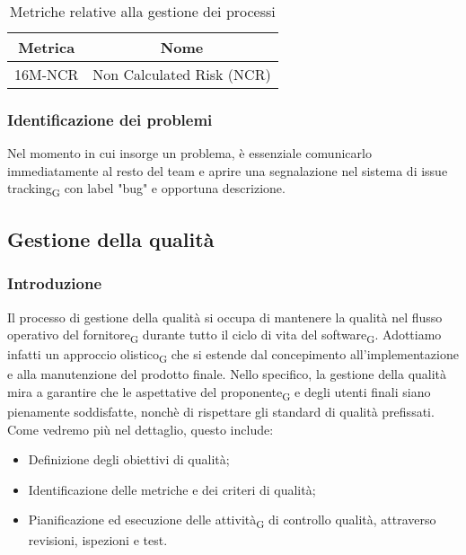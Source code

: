 {{
\begin{table}[h] 
    \caption{Metriche relative alla gestione dei processi}
    \centering
    \begin{tabular}{|c|c|}
    \hline
    \textbf{Metrica} & \textbf{Nome} \\
    \hline
    16M-NCR & Non Calculated Risk (NCR) \\
    \hline
    \end{tabular}
\end{table}

\subsubsection{Identificazione dei problemi}
Nel momento in cui insorge un problema, è essenziale comunicarlo immediatamente al resto del team e aprire una segnalazione nel sistema di
{issue tracking\textsubscript{G}} con label "bug" e opportuna descrizione.

\subsection{Gestione della qualità}
\subsubsection{Introduzione}
Il processo di gestione della qualità si occupa di mantenere la qualità nel flusso operativo del {fornitore\textsubscript{G}}
durante tutto il ciclo di vita del {software\textsubscript{G}}. Adottiamo infatti un approccio 
{olistico\textsubscript{G}} che si estende dal concepimento all'implementazione e alla manutenzione del prodotto finale.
Nello specifico, la gestione della qualità mira a garantire che le aspettative del {proponente\textsubscript{G}} e 
degli utenti finali siano pienamente soddisfatte, nonchè di rispettare gli standard di qualità prefissati. Come vedremo più nel dettaglio,
questo include:
\begin{itemize}
    \item Definizione degli obiettivi di qualità;
    \item Identificazione delle metriche e dei criteri di qualità;
    \item Pianificazione ed esecuzione delle {attività\textsubscript{G}} di controllo qualità, attraverso revisioni, ispezioni e test.
\end{itemize}

}}
